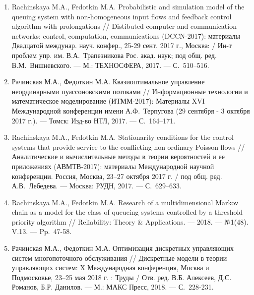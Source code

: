 \begin{enumerate}
	\item Rachinskaya M.A., Fedotkin M.A. Probabilistic and simulation model of the queuing system with non-homogeneous input flows and feedback control algorithm with prolongations // Distibuted computer and communication
	networks: control, computation, communications (DCCN-2017): материалы Двадцатой междунар. науч. конфер., 25-29 сент. 2017 г., Москва: / Ин-т проблем упр. им. В.А.~Трапезникова Рос. акад. наук; под общ. ред. В.М.~Вишневского. — М.: ТЕХНОСФЕРА, 2017. — С.~510–516.
	\item Рачинская М.А., Федоткин М.А. Квазиоптимальное управление неординарными
	пуассоновскими потоками // Информационные технологии и
	математическое моделирование (ИТММ-2017): Материалы XVI Международной конференции имени А.Ф.~Терпугова (29 сентября - 3 октября	2017 г.). — Томск: Изд-во НТЛ, 2017. — С.~164–171.
	\item Rachinskaya M.A., Fedotkin M.A. Stationarity conditions for the control systems that provide service to the conflicting non-ordinary Poisson flows // Аналитические и вычислительные методы в теории вероятностей и ее
	приложениях (АВМТВ-2017): материалы Международной научной конференции. Россия, Москва, 23–27 октября 2017 г. / под общ. ред. А.В.~Лебедева. — Москва: РУДН, 2017. — С.~629–633.
	\item Rachinskaya M.A., Fedotkin M.A. Research of a multidimensional Markov chain as a model for the class of queueing systems controlled by a threshold priority algorithm // Reliability: Theory \& Applications. — 2018. — №1(48). V.13. — Pp.~47-58.
	\item Рачинская М.А., Федоткин М.А. Оптимизация дискретных управляющих систем многопоточного обслуживания // Дискретные модели в теории управляющих систем: Х Международная конференция, Москва и Подмосковье, 23–25 мая 2018 г. : Труды / Отв. ред. В.Б. Алексеев, Д.С. Романов, Б.Р. Данилов. — М.: МАКС Пресс, 2018. — С.~228-231.	
\end{enumerate}	



